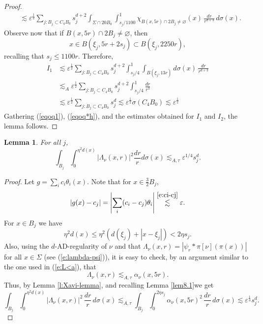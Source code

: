 \documentclass[11pt]{amsart}
\newcommand{\rf}[1]{{(\ref{#1})}}
\newcommand{\ve}{{\varepsilon}}
\newtheorem{lemma}[theorem]{Lemma}
\theoremstyle{definition}
\theoremstyle{remark}
\numberwithin{equation}{section}
\newcommand{\av}[1]{\left| #1 \right|}
\def\lec{\lesssim}
\def\lec{\lesssim}
\begin{document}
\begin{proof}
\begin{align*}
& \lec \ve^{\frac12} \sum_{j: B_{j}\subset C_4B_0} s_{j}^{d+2}  \int_{\Sigma\cap 20 B_{0} }\int_{s_{j}/1100}^{1}\chi_{B(x,5r)\cap 2B_{j}\neq\varnothing}(x)\,\frac{dr}{r^{d+3}} \,d\sigma(x).
\end{align*}
Observe now that if $ B(x,5r)\cap 2B_{j}\neq\varnothing$, then 
$$x\in B(\xi_j,5r+2s_j)\subset B(\xi_j,2250r),$$ 
recalling that $s_j\leq 1100r$. Therefore, 
\begin{align*}
I_1
 & \lec \ve^{\frac12} \sum_{j: B_{j}\subset C_4B_0} s_{j}^{d+2}  \int_{s_{j}/4}^{1}\int_{B(\xi_{j},13r)}  d\sigma(x)\,\frac{dr}{r^{d+3}} \\
  & \lec_A \ve^{\frac12} \sum_{j: B_{j}\subset C_4B_0 } s_{j}^{d+2}  \int_{s_{j}/4}^{1} \frac{dr}{r^{3}}  
  \\
   &    \lec \ve^{\frac12} \sum_{j: B_{j}\subset C_4B_0 } s_{j}^{d}  \lesssim\ve^{\frac12}\sigma(C_4B_{0}) 
     \lec \ve^{\frac12}
\end{align*}
Gathering  \rf{eqoq1}, \rf{eqoq*h}, and
the estimates obtained for $I_1$ and $I_2$, the lemma follows.
\end{proof} 

 

\begin{lemma}
For all $j$,
\begin{equation}
\label{e:small-scales}
\int_{B_{j}}\int_{0}^{\eta^2 d(x)}  |\Lambda_{\nu}(x,r)|^{2}\frac{dr}{r}d\sigma(x) \lec_{A,\tau} \ve^{1/4} s_{j}^{d}.
\end{equation}
\end{lemma}

\begin{proof}
	Let $g= \sum_{i} c_{i}\theta_{i}(x) $. Note that for $x\in \tfrac32B_{j}$, 
	\[
	|g(x) - c_{j}| =\av{\sum_{i} (c_{i}-c_{j})\theta_{i} }
	\stackrel{\eqref{e:ci-cj}}{\lec} \ve .
	\]
	For $x\in B_{j}$ we have
	\[
	\eta^2 d(x) \leq \eta^2(d(\xi_{j}) + |x-\xi_{j}|) < 2 \eta s_{j}.\]
	Also, using the $d$-AD-regularity of $\nu$ and that $\Lambda_{\nu}(x,r)=|\psi_{r}* \pi[\nu](\pi(x))| $ for
all $x\in\Sigma$ (see \rf{e:lambda-psi}), it is easy to check, by an argument similar to the one used in \rf{e:L<a}, that 
\begin{equation}\label{eqkgeq245}
\Lambda_{\nu}(x,r)\lesssim_{A,\tau}\alpha_{\nu}(x,5r).
\end{equation}	
	Thus, by Lemma \eqref{l:Xavi-lemma}, and recalling Lemma \ref{lem8.1}we get
\[
\int_{B_{j}}\int_{0}^{\eta^2 d(x)} |\Lambda_{\nu}(x,r)|^{2} \,\frac{dr}{r} \,d\sigma(x) 
\lec_{A,\tau} \int_{B_{j}} \int_{0}^{2\eta s_{j}}\alpha_{\nu}(x,5r)^{2} \,\frac{dr}{r} \,d\sigma(x)
\lec \ve^{\frac14} s_{j}^{d}.
\]
\end{proof}
\end{document}
